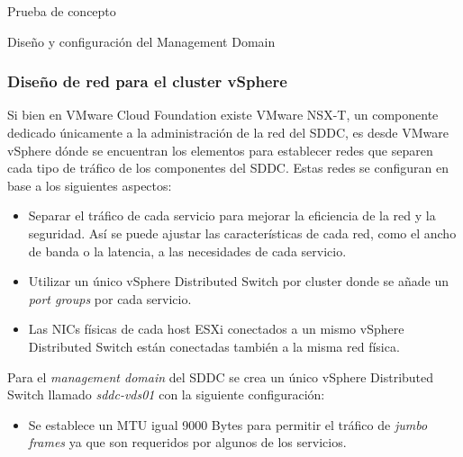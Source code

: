 \begin{section}{Prueba de concepto}
\begin{subsection}{Diseño y configuración del Management Domain}
    \subsubsection{Diseño de red para el cluster vSphere}
    Si bien en VMware Cloud Foundation existe VMware NSX-T, un componente dedicado únicamente a la administración de la red del SDDC, es desde VMware vSphere dónde se encuentran los elementos para establecer redes que separen cada tipo de tráfico de los componentes del SDDC. Estas redes se configuran en base a los siguientes aspectos:
    \begin{itemize}
        \item Separar el tráfico de cada servicio para mejorar la eficiencia de la red y la seguridad. Así se puede ajustar las características de cada red, como el ancho de banda o la latencia, a las necesidades de cada servicio.
        \item Utilizar un único vSphere Distributed Switch por cluster donde se añade un \textit{port groups} por cada servicio.
        \item Las NICs físicas de cada host ESXi conectados a un mismo vSphere Distributed Switch están conectadas también a la misma red física.
    \end{itemize}
    Para el \textit{management domain} del SDDC se crea un único vSphere Distributed Switch llamado \textit{sddc-vds01} con la siguiente configuración:
    \begin{itemize}
        
        \item Se establece un MTU igual 9000 Bytes para permitir el tráfico de \textit{jumbo frames} ya que son requeridos por algunos de los servicios.
        

\end{itemize}
\end{subsection}
\end{section}
